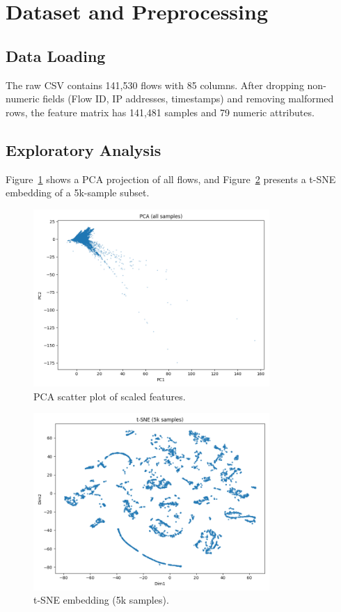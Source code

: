 \documentclass[12pt]{article}
\begin{document}
\section{Dataset and Preprocessing}
\subsection{Data Loading}
The raw CSV contains 141,530 flows with 85 columns. After dropping non-numeric fields (Flow ID, IP addresses, timestamps) and removing malformed rows, the feature matrix has 141,481 samples and 79 numeric attributes.

\subsection{Exploratory Analysis}
Figure~\ref{fig:pca} shows a PCA projection of all flows, and Figure~\ref{fig:tsne} presents a t-SNE embedding of a 5k-sample subset.

\begin{figure}[H]
  \centering
  \includegraphics[width=0.8\textwidth]{images/pca_scatter.png}
  \caption{PCA scatter plot of scaled features.}
  \label{fig:pca}
\end{figure}

\begin{figure}[H]
  \centering
  \includegraphics[width=0.8\textwidth]{images/tsne_scatter.png}
  \caption{t-SNE embedding (5k samples).}
  \label{fig:tsne}
\end{figure}
\end{document}
